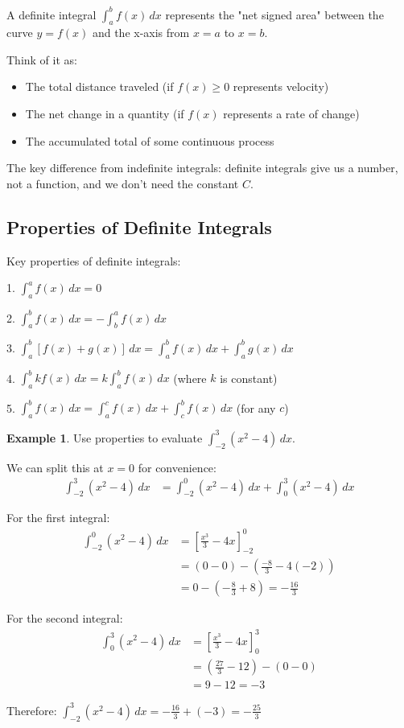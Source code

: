 \documentclass[12pt,a4paper]{book}
\theoremstyle{definition}
\newtheorem{example}{Example}[chapter]
\begin{document}
\begin{intuition}
A definite integral $\int_a^b f(x) \, dx$ represents the "net signed area" between the curve $y = f(x)$ and the x-axis from $x = a$ to $x = b$. 

Think of it as:
\begin{itemize}
    \item The total distance traveled (if $f(x) \geq 0$ represents velocity)
    \item The net change in a quantity (if $f(x)$ represents a rate of change)
    \item The accumulated total of some continuous process
\end{itemize}

The key difference from indefinite integrals: definite integrals give us a number, not a function, and we don't need the constant $C$.
\end{intuition}

\subsection{Properties of Definite Integrals}

\begin{keyformula}
Key properties of definite integrals:

1. $\int_a^a f(x) \, dx = 0$

2. $\int_a^b f(x) \, dx = -\int_b^a f(x) \, dx$

3. $\int_a^b [f(x) + g(x)] \, dx = \int_a^b f(x) \, dx + \int_a^b g(x) \, dx$

4. $\int_a^b kf(x) \, dx = k\int_a^b f(x) \, dx$ (where $k$ is constant)

5. $\int_a^b f(x) \, dx = \int_a^c f(x) \, dx + \int_c^b f(x) \, dx$ (for any $c$)
\end{keyformula}

\begin{example}
Use properties to evaluate $\int_{-2}^3 (x^2 - 4) \, dx$.

We can split this at $x = 0$ for convenience:
\begin{align}
\int_{-2}^3 (x^2 - 4) \, dx &= \int_{-2}^0 (x^2 - 4) \, dx + \int_0^3 (x^2 - 4) \, dx
\end{align}

For the first integral:
\begin{align}
\int_{-2}^0 (x^2 - 4) \, dx &= \left[ \frac{x^3}{3} - 4x \right]_{-2}^0\\
&= (0 - 0) - \left(\frac{-8}{3} - 4(-2)\right)\\
&= 0 - \left(-\frac{8}{3} + 8\right) = -\frac{16}{3}
\end{align}

For the second integral:
\begin{align}
\int_0^3 (x^2 - 4) \, dx &= \left[ \frac{x^3}{3} - 4x \right]_0^3\\
&= \left(\frac{27}{3} - 12\right) - (0 - 0)\\
&= 9 - 12 = -3
\end{align}

Therefore: $\int_{-2}^3 (x^2 - 4) \, dx = -\frac{16}{3} + (-3) = -\frac{25}{3}$
\end{example}
\end{document}
